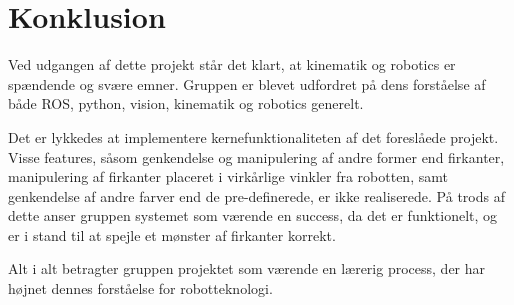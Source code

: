 \chapter{Konklusion}\label{chap:Konklusion}

Ved udgangen af dette projekt står det klart, at kinematik og robotics er spændende og svære emner. Gruppen er blevet udfordret på dens forståelse af både ROS, python, vision, kinematik og robotics generelt. 

Det er lykkedes at implementere kernefunktionaliteten af det foreslåede projekt. Visse features, såsom genkendelse og manipulering af andre former end firkanter, manipulering af firkanter placeret i virkårlige vinkler fra robotten, samt genkendelse af andre farver end de pre-definerede, er ikke realiserede. På trods af dette anser gruppen systemet som værende en success, da det er funktionelt, og er i stand til at spejle et mønster af firkanter korrekt.  

Alt i alt betragter gruppen projektet som værende en lærerig process, der har højnet dennes forståelse for robotteknologi.
